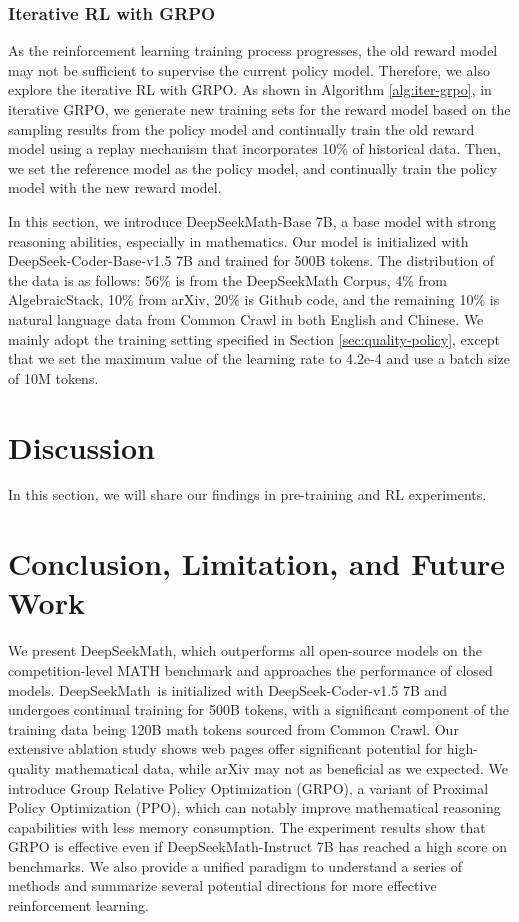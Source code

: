\begin{itemize}[topsep=0pt]
\subsubsection{Iterative RL with GRPO} As the reinforcement learning training process progresses, the old reward model may not be sufficient to supervise the current policy model. Therefore, we also explore the iterative RL with GRPO. As shown in Algorithm \ref{alg:iter-grpo}, in iterative GRPO, we generate new training sets for the reward model based on the sampling results from the policy model and continually train the old reward model using a replay mechanism that incorporates 10\% of historical data. Then, we set the reference model as the policy model, and continually train the policy model with the new reward model.

In this section, we introduce DeepSeekMath-Base 7B, a base model with strong reasoning abilities, especially in mathematics. Our model is initialized with DeepSeek-Coder-Base-v1.5 7B \citep{deepseek-coder} and trained for 500B tokens. The distribution of the data  is as follows: 56\% is from the DeepSeekMath Corpus, 4\% from AlgebraicStack, 10\% from arXiv, 20\% is Github code, and the remaining 10\% is natural language data from Common Crawl in both English and Chinese. We mainly adopt the training setting specified in Section \ref{sec:quality-policy}, except that we set the maximum value of the learning rate to 4.2e-4 and use a batch size of 10M tokens.

\section{Discussion}
In this section, we will share our findings in pre-training and RL experiments. 

\section{Conclusion, Limitation, and Future Work} We present DeepSeekMath, which outperforms all open-source models on the competition-level MATH benchmark and approaches the performance of closed models. DeepSeekMath~is initialized with DeepSeek-Coder-v1.5 7B and undergoes continual training for 500B tokens, with a significant component of the training data being 120B math tokens sourced from Common Crawl. Our extensive ablation study shows web pages offer significant potential for high-quality mathematical data, while arXiv may not as beneficial as we expected. We introduce Group Relative Policy Optimization (GRPO), a variant of Proximal Policy Optimization (PPO), which can notably improve mathematical reasoning capabilities with less memory consumption. The experiment results show that GRPO is effective even if DeepSeekMath-Instruct 7B has reached a high score on benchmarks. We also provide a unified paradigm to understand a series of methods and summarize several potential directions for more effective reinforcement learning.


\end{itemize}

